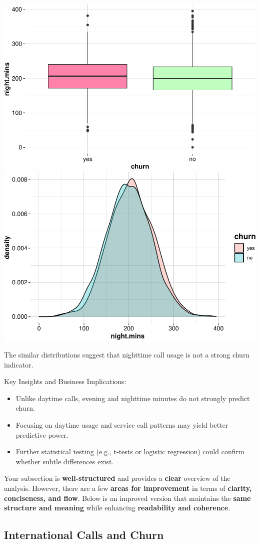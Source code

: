 \documentclass[
]{book}
\providecommand{\tightlist}{%
  \setlength{\itemsep}{0pt}\setlength{\parskip}{0pt}}
\theoremstyle{definition}
\theoremstyle{definition}
\theoremstyle{definition}
\theoremstyle{definition}
\theoremstyle{remark}
\begin{document}
\includegraphics[width=0.5\linewidth]{EDA_files/figure-latex/unnamed-chunk-13-1} \includegraphics[width=0.5\linewidth]{EDA_files/figure-latex/unnamed-chunk-13-2}

The similar distributions suggest that nighttime call usage is not a strong churn indicator.

Key Insights and Business Implications:

\begin{itemize}
\tightlist
\item
  Unlike daytime calls, evening and nighttime minutes do not strongly predict churn.\\
\item
  Focusing on daytime usage and service call patterns may yield better predictive power.\\
\item
  Further statistical testing (e.g., t-tests or logistic regression) could confirm whether subtle differences exist.
\end{itemize}

Your subsection is \textbf{well-structured} and provides a \textbf{clear} overview of the analysis. However, there are a few \textbf{areas for improvement} in terms of \textbf{clarity, conciseness, and flow}. Below is an improved version that maintains the \textbf{same structure and meaning} while enhancing \textbf{readability and coherence}.

\subsection*{International Calls and Churn}\label{international-calls-and-churn}
\end{document}

